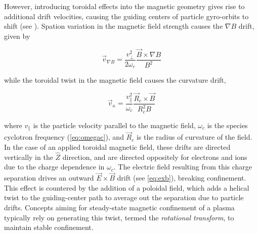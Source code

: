 However, introducing toroidal effects into the magnetic geometry gives rise to additional drift velocities, causing the guiding centers of particle gyro-orbits to shift (see \cite[\S~8.5-7]{Freidberg2007}).  Spation variation in the magnetic field strength causes the $\nabla B$ drift, given by

\begin{equation}\label{eq:gradbdrift}
 \vec{v}_{\nabla B} = \frac{v_\perp^2}{2\omega_c} \frac{\vec{B} \times \nabla B}{B^2}
\end{equation}

\noindent while the toroidal twist in the magnetic field causes the curvature drift,

\begin{equation}\label{eq:curvaturedrift}
 \vec{v}_\kappa = \frac{v_\parallel^2}{\omega_c} \frac{\vec{R}_c \times \vec{B}}{R_c^2 B}
\end{equation}

\noindent where $v_\parallel$ is the particle velocity parallel to the magnetic field, $\omega_c$ is the species cyclotron frequency (\cref{eq:omegac}), and $\vec{R}_c$ is the radius of curvature of the field.  In the case of an applied toroidal magnetic field, these drifts are directed vertically in the $\hat{Z}$ direction, and are directed oppositely for electrons and ions due to the charge dependence in $\omega_c$.  The electric field resulting from this charge separation drives an outward $\vec{E} \times \vec{B}$ drift (see \cref{eq:exb}), breaking confinement.  This effect is countered by the addition of a poloidal field, which adds a helical twist to the guiding-center path to average out the separation due to particle drifts.  Concepts aiming for steady-state magnetic confinement of a plasma typically rely on generating this twist, termed the \emph{rotational transform}, to maintain stable confinement.
 
